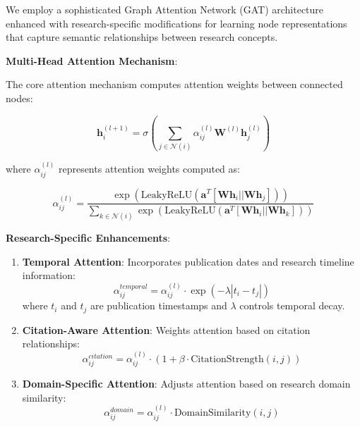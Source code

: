 \documentclass[10pt,twocolumn]{article}
\begin{document}
We employ a sophisticated Graph Attention Network (GAT) architecture \cite{velickovic2017graph} enhanced with research-specific modifications for learning node representations that capture semantic relationships between research concepts.

\textbf{Multi-Head Attention Mechanism}:

The core attention mechanism computes attention weights between connected nodes:

\begin{equation}
\mathbf{h}_i^{(l+1)} = \sigma\left(\sum_{j \in \mathcal{N}(i)} \alpha_{ij}^{(l)} \mathbf{W}^{(l)} \mathbf{h}_j^{(l)}\right)
\end{equation}

where $\alpha_{ij}^{(l)}$ represents attention weights computed as:

\begin{equation}
\alpha_{ij}^{(l)} = \frac{\exp(\text{LeakyReLU}(\mathbf{a}^T[\mathbf{W}\mathbf{h}_i || \mathbf{W}\mathbf{h}_j]))}{\sum_{k \in \mathcal{N}(i)} \exp(\text{LeakyReLU}(\mathbf{a}^T[\mathbf{W}\mathbf{h}_i || \mathbf{W}\mathbf{h}_k]))}
\end{equation}

\textbf{Research-Specific Enhancements}:

\begin{enumerate}
    \item \textbf{Temporal Attention}: Incorporates publication dates and research timeline information:
    \begin{equation}
    \alpha_{ij}^{temporal} = \alpha_{ij}^{(l)} \cdot \exp(-\lambda |t_i - t_j|)
    \end{equation}
    where $t_i$ and $t_j$ are publication timestamps and $\lambda$ controls temporal decay.
    
    \item \textbf{Citation-Aware Attention}: Weights attention based on citation relationships:
    \begin{equation}
    \alpha_{ij}^{citation} = \alpha_{ij}^{(l)} \cdot (1 + \beta \cdot \text{CitationStrength}(i, j))
    \end{equation}
    
    \item \textbf{Domain-Specific Attention}: Adjusts attention based on research domain similarity:
    \begin{equation}
    \alpha_{ij}^{domain} = \alpha_{ij}^{(l)} \cdot \text{DomainSimilarity}(i, j)
    \end{equation}
\end{enumerate}
\end{document}
